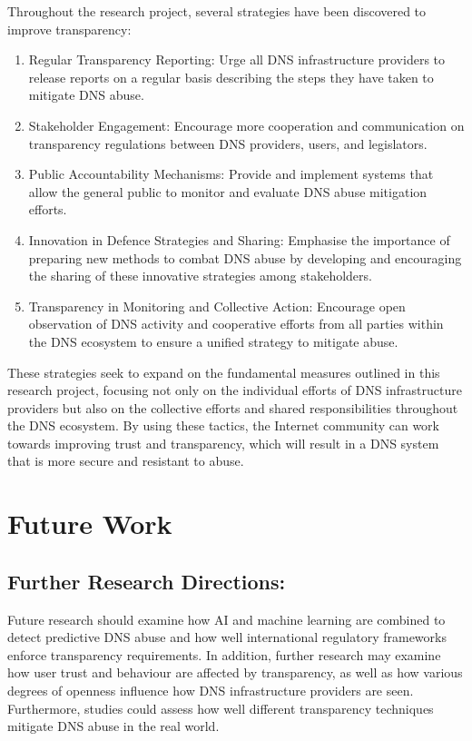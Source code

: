 Throughout the research project, several strategies have been discovered to improve transparency:


\begin{enumerate}

    \item Regular Transparency Reporting: Urge all DNS infrastructure providers to release reports on a regular basis describing the steps they have taken to mitigate DNS abuse.

    \item Stakeholder Engagement: Encourage more cooperation and communication on transparency regulations between DNS providers, users, and legislators.

    \item Public Accountability Mechanisms: Provide and implement systems that allow the general public to monitor and evaluate DNS abuse mitigation efforts.
    
    \item Innovation in Defence Strategies and Sharing: Emphasise the importance of preparing new methods to combat DNS abuse by developing and encouraging the sharing of these innovative strategies among stakeholders.
    
    \item Transparency in Monitoring and Collective Action: Encourage open observation of DNS activity and cooperative efforts from all parties within the DNS ecosystem to ensure a unified strategy to mitigate abuse.
    
\end{enumerate}

These strategies seek to expand on the fundamental measures outlined in this research project, focusing not only on the individual efforts of DNS infrastructure providers but also on the collective efforts and shared responsibilities throughout the DNS ecosystem. By using these tactics, the Internet community can work towards improving trust and transparency, which will result in a DNS system that is more secure and resistant to abuse.

\section{Future Work}

\subsection{Further Research Directions:} Future research should examine how AI and machine learning are combined to detect predictive DNS abuse and how well international regulatory frameworks enforce transparency requirements. In addition, further research may examine how user trust and behaviour are affected by transparency, as well as how various degrees of openness influence how DNS infrastructure providers are seen. Furthermore, studies could assess how well different transparency techniques mitigate DNS abuse in the real world.

